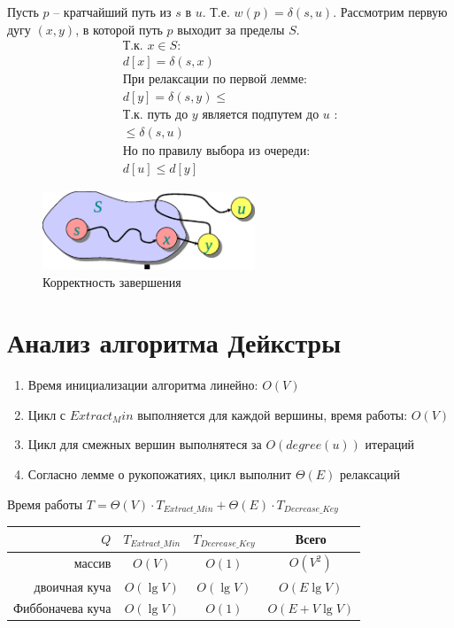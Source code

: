 \documentclass[11pt]{article}
\begin{document}
\begin{enumerate}
Пусть $p$ -- кратчайший путь из $s$ в $u$. Т.е. $w(p) = \delta(s, u)$. Рассмотрим первую дугу $(x, y)$, в которой путь $p$ выходит за пределы $S$.
\begin{align*}
  \text{Т.к. }x \in S: \\
  d[x] = \delta(s, x) \\
  \text{При релаксации по первой лемме:} \\
  d[y] = \delta(s, y) \leqslant \\
  \text{Т.к. путь до }y\text{ является подпутем до }u\text{ :} \\
  \leqslant \delta(s, u) \\
  \text{Но по правилу выбора из очереди:} \\
  d[u] \leqslant d[y]
\end{align*}
\begin{figure}[h!]
  \centering
  \includegraphics[width=2.5in]{lecture17/correctness.eps}
  \caption{Корректность завершения}
\end{figure}
\end{enumerate}

\section{Анализ алгоритма Дейкстры}
\begin{enumerate}
\item Время инициализации алгоритма линейно: $O(V)$
\item Цикл с $Extract_Min$ выполняется для каждой вершины, время работы: $O(V)$
\item Цикл для смежных вершин выполнятеся за $O(degree(u))$ итераций
\item Согласно лемме о рукопожатиях, цикл выполнит $\Theta(E)$ релаксаций
\end{enumerate}
Время работы $T = \Theta(V) \cdot T_{Extract\_Min} + \Theta(E) \cdot T_{Decrease\_Key}$
\begin{center}
\begin{tabular}{|r|c|c|c|}
  \hline
     $Q$ & $T_{Extract\_Min}$ & $T_{Decrease\_Key}$ & Всего \\
  \hline
      массив & $O(V)$ & $O(1)$ & $O(V^2)$ \\
  \hline
      двоичная куча & $O(\lg V)$ & $O(\lg V)$ & $O(E \lg V)$ \\
  \hline
      Фиббоначева куча & $O(\lg V)$ & $O(1)$ & $O(E + V \lg V)$ \\
  \hline
\end{tabular}
\end{center}
\end{document}
